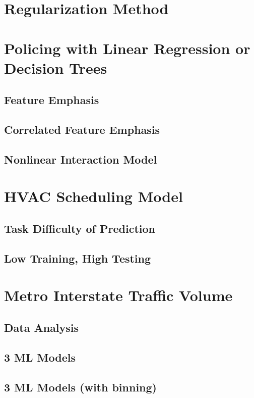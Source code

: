 \documentclass[12pt]{article}
\begin{document}
\maketitlepage

\section{Regularization Method}

\section{Policing with Linear Regression or Decision Trees}

\subsection{Feature Emphasis}

\subsection{Correlated Feature Emphasis}

\subsection{Nonlinear Interaction Model}

\section{HVAC Scheduling Model}

\subsection{Task Difficulty of Prediction}

\subsection{Low Training, High Testing}

\section{Metro Interstate Traffic Volume}

\subsection{Data Analysis}

\subsection{3 ML Models}

\subsection{3 ML Models (with binning)}
\end{document}
